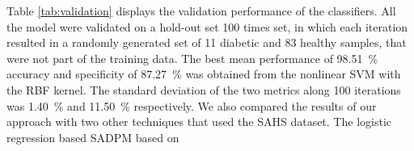 \documentclass[journal,comsoc]{IEEEtran}
\renewcommand{\^}{\hat}  %
\begin{document}
Table \ref{tab:validation} displays the validation performance of the classifiers. All the model were validated on a hold-out set \num{100} times set, in which each iteration resulted in a randomly generated set of \num{11} diabetic and \num{83} healthy samples, that were not part of the training data. The best mean performance of \SI{98.51}{\percent} accuracy and  specificity of \SI{87.27}{\percent} was obtained from the nonlinear SVM with the RBF kernel. The standard deviation of the two metrics along \num{100} iterations was \SI{1.40}{\percent} and \SI{11.50}{\percent} respectively. We also compared the results of our approach with two other techniques that used the SAHS dataset. The logistic regression based SADPM based on
%
%
%
\end{document}
